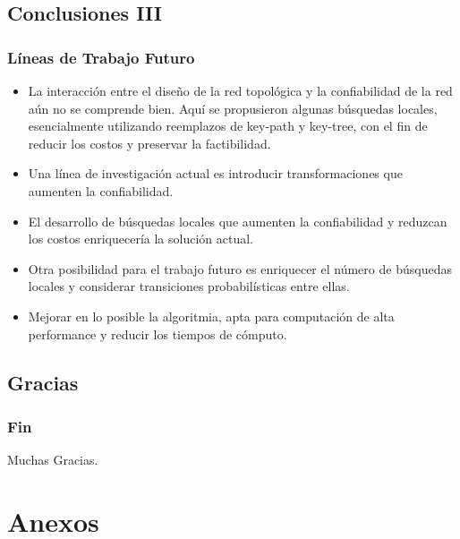 \subsection{Conclusiones III}
\begin{frame} \frametitle{Líneas de Trabajo Futuro}
\begin{block} {}
   	\begin{scriptsize}
 	 \begin{itemize}
 	 	\item La interacción entre el diseño de la red topológica y la confiabilidad de la red aún no se comprende bien. Aquí se propusieron algunas búsquedas locales, esencialmente utilizando reemplazos de key-path y key-tree, con el fin de reducir los costos y preservar la factibilidad.
 	 	\item Una línea de investigación actual es introducir transformaciones que aumenten la confiabilidad. 
 	 	\item El desarrollo de búsquedas locales que aumenten la confiabilidad y reduzcan los costos enriquecería la solución actual.
 	 	\item Otra posibilidad para el trabajo futuro es enriquecer el número de búsquedas locales y considerar transiciones probabilísticas entre ellas.
 	 	\item Mejorar en lo posible la algoritmia, apta para computación de alta performance y reducir los tiempos de cómputo.
 	 \end{itemize}  
 	\end{scriptsize}
 \end{block} 	   
\end{frame}

\subsection{Gracias}
\begin{frame} \frametitle{Fin}
\begin{huge}
Muchas Gracias.
\end{huge}
\end{frame}

\section{Anexos}

